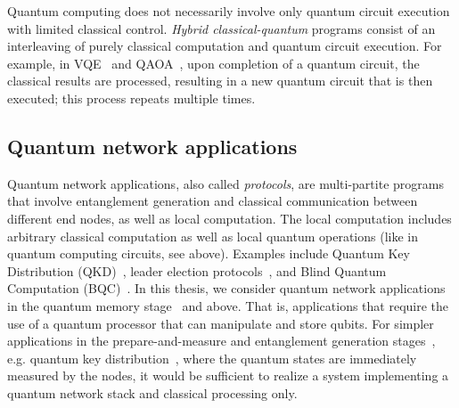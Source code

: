 Quantum computing does not necessarily involve only quantum circuit execution with limited classical control.
\emph{Hybrid classical-quantum} programs consist of an interleaving of purely classical computation and quantum circuit execution.
For example, in \acf{VQE}~\cite{diadamo2021distributed, liu2022layer} and \acf{QAOA}~\cite{farhi2014quantum},
upon completion of a quantum circuit, the classical results are processed, resulting in a new quantum circuit that is then executed; this process repeats multiple times.

\subsection{Quantum network applications}
Quantum network applications, also called \textit{protocols}, are multi-partite programs that involve entanglement generation and classical communication between different end nodes, as well as local computation.
The local computation includes arbitrary classical computation as well as local quantum operations (like in quantum computing circuits, see above).
Examples include Quantum Key Distribution (QKD)~\cite{bb84, ekert_1991_e91}, leader election protocols~\cite{kobayashi2014simpler, ganz2009quantum}, and Blind Quantum Computation (BQC)~\cite{Wehner2018stages}.
In this thesis, we consider quantum network applications in the quantum memory stage~\cite{wehner_2018_stages} and above. That is, applications that require the use of a quantum processor that can manipulate and store qubits. For simpler applications in the prepare-and-measure and entanglement generation stages~\cite{wehner_2018_stages}, e.g. quantum key distribution~\cite{bb84Original,ekert_1991_e91}, where the quantum states are immediately measured by the nodes, it would be sufficient to realize a system implementing a quantum network stack and classical processing only.

